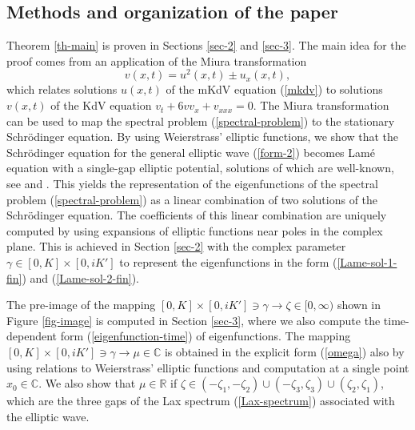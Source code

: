 \documentclass[12pt,reqno]{amsart}
\numberwithin{equation}{section}
\begin{document}
\subsection{Methods and organization of the paper}

Theorem \ref{th-main} is proven in Sections \ref{sec-2} and \ref{sec-3}. 
The main idea for the proof comes from an application of the Miura transformation 
\begin{equation}
\label{Miura-time}
v(x,t) = u^2(x,t) \pm u_x(x,t),
\end{equation}
which relates solutions $u(x,t)$ of the mKdV equation (\ref{mkdv}) to solutions  $v(x,t)$ of the KdV equation $v_t + 6 v v_x + v_{xxx} = 0$. The Miura 
transformation can be used to map the spectral problem (\ref{spectral-problem}) to 
the stationary Schr\"{o}dinger equation. By using Weierstrass' elliptic functions, we show that the Schr\"{o}dinger equation for the general elliptic wave (\ref{form-2}) becomes Lam\'{e} equation with a single-gap elliptic potential, solutions of which are well-known, see \cite[p.395]{Ince} and \cite[Section 3]{GW95}. This yields the representation of the eigenfunctions of the spectral problem 
(\ref{spectral-problem}) as a linear combination of two solutions of the 
Schr\"{o}dinger equation. The coefficients of this linear combination are 
uniquely computed by using expansions of elliptic functions near poles in the complex plane. This is achieved in Section \ref{sec-2} with the complex parameter $\gamma \in [0,K] \times [0,iK']$ to represent the eigenfunctions in the form (\ref{Lame-sol-1-fin}) and (\ref{Lame-sol-2-fin}). 

The pre-image of the mapping $[0,K] \times [0,iK'] \ni \gamma \to \zeta \in [0,\infty)$ shown in Figure \ref{fig-image} is computed in Section \ref{sec-3}, where we also compute the time-dependent form (\ref{eigenfunction-time}) of eigenfunctions. The mapping $[0,K] \times [0,iK'] \ni \gamma \to \mu \in \mathbb{C}$ is obtained in the explicit form (\ref{omega}) also by using 
relations to Weierstrass' elliptic functions and computation at a single point $x_0 \in \mathbb{C}$. We also show that $\mu \in \mathbb{R}$ if $\zeta \in (-\zeta_1,-\zeta_2) \cup (-\zeta_3,\zeta_3) \cup (\zeta_2,\zeta_1)$, which are 
the three gaps of the Lax spectrum (\ref{Lax-spectrum}) associated with the elliptic wave. 
\end{document}
